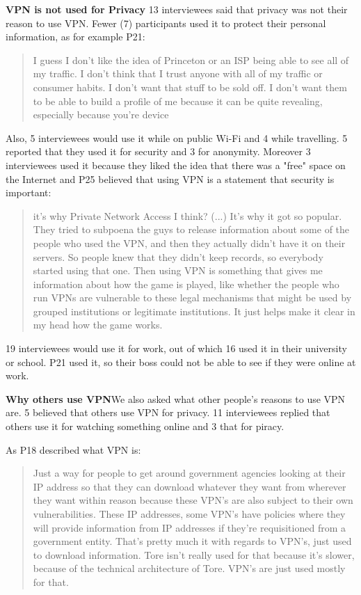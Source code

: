 \textbf{VPN is not used for Privacy} 13 interviewees said that privacy was not
their reason to use VPN. Fewer (7) participants used it to protect their
personal information, as for example P21: \begin{quote}I guess I don't like
the idea of Princeton or an ISP being able to see all of my traffic. I don't
think that I trust anyone with all of my traffic or consumer habits. I don't
want that stuff to be sold off. I don't want them to be able to build a
profile of me because it can be quite revealing, especially because you're
device\end{quote}


Also, 5 interviewees would use it while on public Wi-Fi and 4 while
travelling. 5 reported that they used it for security and 3 for anonymity.
Moreover 3 interviewees used it because they liked the idea that there was a
"free" space on the Internet and P25 believed that using VPN is a statement
that security is important:

\begin{quote}it's why Private Network Access I think? (...) It's why it got so
popular. They tried to subpoena the guys to release information about some of
the people who used the VPN, and then they actually didn't have it on their
servers. So people knew that they didn't keep records, so everybody started
using that one. Then using VPN is something that gives me information about
how the game is played, like whether the people who run VPNs are vulnerable to
these legal mechanisms that might be used by grouped institutions or
legitimate institutions. It just helps make it clear in my head how the game
works.\end{quote}


19 interviewees would use it for work, out of which 16 used it in their
university or school. P21 used it, so their boss could not be able to see if
they were online at work.


\textbf{Why others use VPN}We also asked what other people's reasons to use
VPN are. 5 believed that others use VPN for privacy. 11 interviewees replied
that others use it for watching something online and 3 that for piracy.

As P18 described what VPN is: \begin{quote} Just a way for people to get
around government agencies looking at their IP address so that they can
download whatever they want from wherever they want within reason because
these VPN's are also subject to their own vulnerabilities. These IP addresses,
some VPN's have policies where they will provide information from IP addresses
if they're requisitioned from a government entity. That's pretty much it with
regards to VPN's, just used to download information. Tore isn't really used
for that because it's slower, because of the technical architecture of Tore.
VPN's are just used mostly for that.\end{quote}

